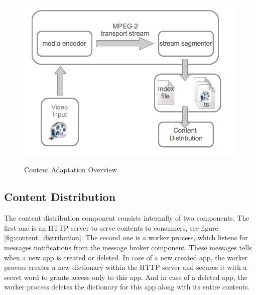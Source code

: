 \begin{figure}[htb]
  \centering
  \includegraphics[scale=0.3]{img/content_adaptation_overview.png}\\
  \caption{Content Adaptation Overview}
  \label{fig:content_adaptation_overview}
\end{figure}

\pagebreak

\subsection{Content Distribution\label{sec:des_cdn}}
The content distribution component consists internally of two components. The first one is an \ac{HTTP} server to serve contents to consumers, see figure \ref{fig:content_distribution}. The second one is a worker process, which listens for messages notifications from the message broker component. These messages tells when a new app is created or deleted. In case of a new created app, the worker process creates a new dictionary within the \ac{HTTP} server and secures it with a secret word to grants access only to this app. And in case of a deleted app, the worker process deletes the dictionary for this app along with its entire contents.


